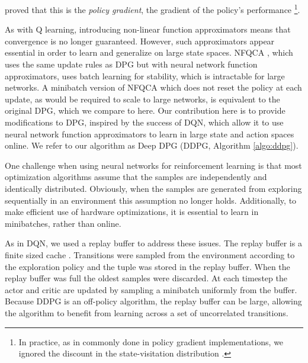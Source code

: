 \documentclass{article} \usepackage{iclr2016_conference,times}
\begin{document}
\citet{silver2014deterministic} proved that this is
the \emph{policy gradient}, the gradient of the policy's
performance \footnote{In practice, as in commonly done in policy gradient implementations,
we ignored the discount in the state-visitation distribution .}.

As with Q learning, introducing non-linear function approximators
means that convergence is no longer guaranteed. However, such
approximators appear essential in order to learn and generalize on
large state spaces. NFQCA \citep{hafner2011reinforcement}, which uses
the same update rules as DPG but with neural network function
approximators, uses batch learning for stability, which is intractable
for large networks.
A minibatch version of NFQCA which does not reset
the policy at each update, as would be required to scale to large networks,
is equivalent to the original DPG, which we compare to here.
Our contribution here is to provide
modifications to DPG, inspired by the success of DQN, which allow it
to use neural network function approximators to learn in
large state and action spaces online. We refer to our algorithm as
Deep DPG (DDPG, Algorithm \ref{algo:ddpg}).

One challenge when using neural networks for reinforcement learning is
that most optimization algorithms assume that the samples are independently
and identically distributed. Obviously, when the samples are generated
from exploring sequentially in an environment this assumption no longer holds.
Additionally, to make efficient use of hardware optimizations, it is essential
to learn in minibatches, rather than online.

As in DQN, we used a replay buffer to address
these issues. The replay buffer is a finite sized cache .
Transitions were sampled
from the environment according to the exploration policy and the tuple
 was stored in the replay buffer.
When the replay buffer was full the oldest samples were discarded.
At each timestep the actor and critic are updated by sampling a minibatch
uniformly from the buffer. Because DDPG is an off-policy algorithm, the
replay buffer can be large, allowing the algorithm to benefit from
learning across a set of uncorrelated transitions.
\end{document}
